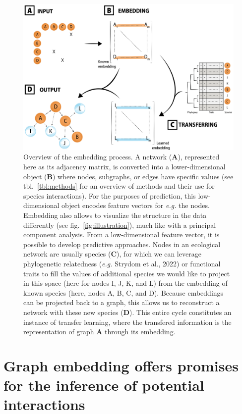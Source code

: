 \documentclass[10pt,oneside]{article}
\makeatletter
\def\maxwidth{\ifdim\Gin@nat@width>\linewidth\linewidth
\else\Gin@nat@width\fi}
\let\Oldincludegraphics\includegraphics
\renewcommand{\includegraphics}[1]{\Oldincludegraphics[width=\maxwidth]{#1}}
\makeatother
\begin{document}
\begin{figure}
\hypertarget{fig:embedding}{%
\centering
\includegraphics{figures/conceptual_2.png}
\caption{Overview of the embedding process. A network (\textbf{A}),
represented here as its adjacency matrix, is converted into a
lower-dimensional object (\textbf{B}) where nodes, subgraphs, or edges
have specific values (see tbl.~\ref{tbl:methods} for an overview of
methods and their use for species interactions). For the purposes of
prediction, this low-dimensional object encodes feature vectors for
\emph{e.g.} the nodes. Embedding also allows to visualize the structure
in the data differently (see fig.~\ref{fig:illustration}), much like
with a principal component analysis. From a low-dimensional feature
vector, it is possible to develop predictive approaches. Nodes in an
ecological network are usually species (\textbf{C}), for which we can
leverage phylogenetic relatedness (\emph{e.g.} Strydom et al., 2022) or
functional traits to fill the values of additional species we would like
to project in this space (here for nodes I, J, K, and L) from the
embedding of known species (here, nodes A, B, C, and D). Because
embeddings can be projected back to a graph, this allows us to
reconstruct a network with these new species (\textbf{D}). This entire
cycle constitutes an instance of transfer learning, where the transfered
information is the representation of graph \textbf{A} through its
embedding.}\label{fig:embedding}
}
\end{figure}

\hypertarget{graph-embedding-offers-promises-for-the-inference-of-potential-interactions}{%
\section{Graph embedding offers promises for the inference of potential
interactions}\label{graph-embedding-offers-promises-for-the-inference-of-potential-interactions}}
\end{document}
